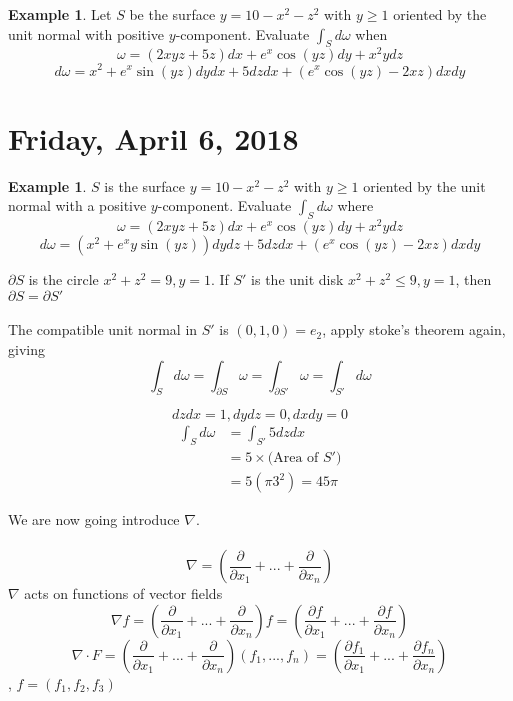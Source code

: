 \documentclass[12pt]{article}
\theoremstyle{plain}
\theoremstyle{definition}
\newtheorem{example}[theorem]{Example}
\begin{document}
\begin{example}
	Let $S$ be the surface $y=10-x^2-z^2$ with $y\geq 1$ oriented by the unit normal with positive $y$-component. Evaluate $\int_S d\omega$ when $$\omega = (2xyz+5z)dx + e^x \cos (yz) dy + x^2y dz$$
	$$d\omega = x^2 +e^x \sin (yz) dydx + 5dzdx + (e^x \cos (yz) - 2xz)dxdy$$
\end{example}

\newpage

\section{Friday, April 6, 2018}

\begin{example}
	$S$ is the surface $y=10-x^2-z^2$ with $y\geq 1$ oriented by the unit normal with a positive $y$-component. Evaluate $\int_S d\omega$ where $$\omega = (2xyz+5z)dx + e^x \cos(yz)dy + x^2ydz$$
	$$d\omega = (x^2 +e^x y \sin(yz))dydz + 5dzdx + (e^x \cos(yz) - 2xz)dxdy$$

	$\partial S$ is the circle $x^2 + z^2 = 9, y = 1$. If $S'$ is the unit disk $x^2 + z^2 \leq 9, y = 1$, then $\partial S = \partial S'$\\
	\\
	The compatible unit normal in $S'$ is $(0,1,0) = e_2$, apply stoke's theorem again, giving
	$$\int_S d\omega = \int_{\partial S} \omega = \int_{\partial S'} \omega = \int_{S'} d\omega$$

	$$dzdx = 1, dydz = 0, dxdy = 0$$
	\begin{align*}
		\int_S d\omega &= \int_{S'} 5 dzdx\\
		&= 5 \times \text{(Area of $S'$)}\\
		&= 5(\pi3^2) = 45\pi
	\end{align*}
\end{example}

We are now going introduce $\nabla$.\\
\\
$$\nabla = (\frac{\partial}{\partial x_1} + ... + \frac{\partial}{\partial x_n})$$
$\nabla$ acts on functions of vector fields
$$\nabla f = (\frac{\partial}{\partial x_1} + ... + \frac{\partial}{\partial x_n})f = (\frac{\partial f}{\partial x_1} + ... + \frac{\partial f}{\partial x_n}) $$
$$\nabla \cdot F = (\frac{\partial}{\partial x_1} + ... + \frac{\partial}{\partial x_n}) (f_1,...,f_n) = (\frac{\partial f_1}{\partial x_1} + ... + \frac{\partial f_n}{\partial x_n})$$
, $f=(f_1, f_2, f_3)$
\end{document}
